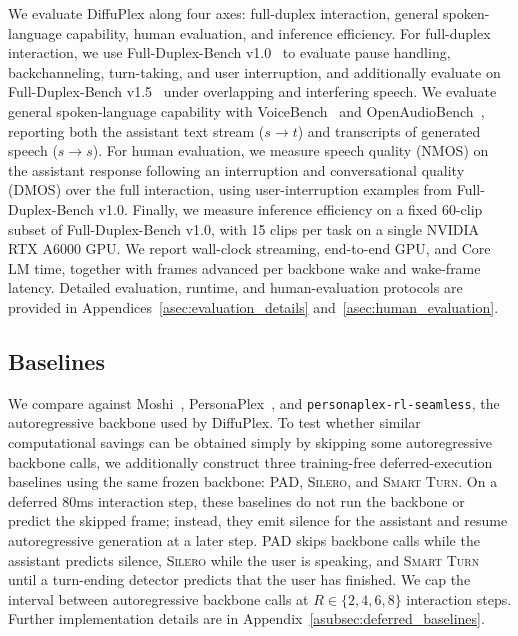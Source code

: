 We evaluate DiffuPlex along four axes: full-duplex interaction, general spoken-language capability, human evaluation, and inference efficiency.
For full-duplex interaction, we use Full-Duplex-Bench v1.0~\citep{11433838} to evaluate pause handling, backchanneling, turn-taking, and user interruption, and additionally evaluate on Full-Duplex-Bench v1.5~\citep{11463576} under overlapping and interfering speech.
We evaluate general spoken-language capability with VoiceBench~\citep{chen-etal-2026-voicebench} and OpenAudioBench~\citep{li2025baichuanaudiounifiedframeworkendtoend}, reporting both the assistant text stream ($s{\rightarrow}t$) and transcripts of generated speech ($s{\rightarrow}s$).
For human evaluation, we measure speech quality (NMOS) on the assistant response following an interruption and conversational quality (DMOS) over the full interaction, using user-interruption examples from Full-Duplex-Bench v1.0.
Finally, we measure inference efficiency on a fixed 60-clip subset of Full-Duplex-Bench v1.0, with 15 clips per task on a single NVIDIA RTX A6000 GPU.
We report wall-clock streaming, end-to-end GPU, and Core LM time, together with frames advanced per backbone wake and wake-frame latency.
Detailed evaluation, runtime, and human-evaluation protocols are provided in Appendices~\ref{asec:evaluation_details} and~\ref{asec:human_evaluation}.

\subsection{Baselines}
\label{subsec:baselines}

We compare against Moshi~\citep{defossez2024moshispeechtextfoundationmodel}, PersonaPlex~\citep{11463413}, and \texttt{personaplex-rl-seamless}, the autoregressive backbone used by DiffuPlex.
To test whether similar computational savings can be obtained simply by skipping some autoregressive backbone calls, we additionally construct three training-free deferred-execution baselines using the same frozen backbone: \textsc{PAD}, \textsc{Silero}, and \textsc{Smart Turn}.
On a deferred 80ms interaction step, these baselines do not run the backbone or predict the skipped frame; instead, they emit silence for the assistant and resume autoregressive generation at a later step.
\textsc{PAD} skips backbone calls while the assistant predicts silence, \textsc{Silero} while the user is speaking, and \textsc{Smart Turn} until a turn-ending detector predicts that the user has finished.
We cap the interval between autoregressive backbone calls at $R\in\{2,4,6,8\}$ interaction steps.
Further implementation details are in Appendix~\ref{asubsec:deferred_baselines}.

